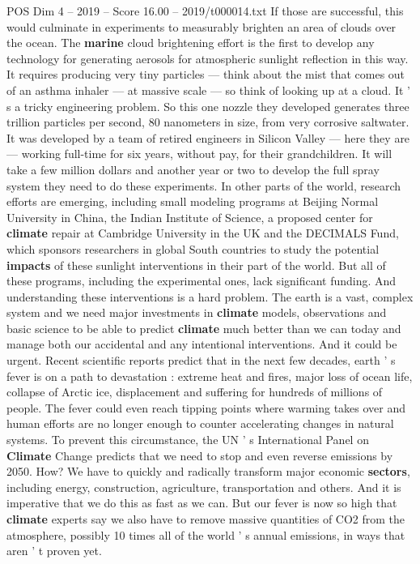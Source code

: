 \begin{textsample}{POS Dim 4 – 2019 – Score 16.00 – 2019/t000014.txt}
If those are successful, this would culminate in experiments to measurably brighten an area of clouds over the ocean.
The \textbf{marine} cloud brightening effort is the first to develop any technology for generating aerosols for atmospheric sunlight reflection in this way.
It requires producing very tiny particles — think about the mist that comes out of an asthma inhaler — at massive scale — so think of looking up at a cloud.
It ' s a tricky engineering problem.
So this one nozzle they developed generates three trillion particles per second, 80 nanometers in size, from very corrosive saltwater.
It was developed by a team of retired engineers in Silicon Valley — here they are — working full-time for six years, without pay, for their grandchildren.
It will take a few million dollars and another year or two to develop the full spray system they need to do these experiments.
In other parts of the world, research efforts are emerging, including small modeling programs at Beijing Normal University in China, the Indian Institute of Science, a proposed center for \textbf{climate} repair at Cambridge University in the UK and the DECIMALS Fund, which sponsors researchers in global South countries to study the potential \textbf{impacts} of these sunlight interventions in their part of the world.
But all of these programs, including the experimental ones, lack significant funding.
And understanding these interventions is a hard problem.
The earth is a vast, complex system and we need major investments in \textbf{climate} models, observations and basic science to be able to predict \textbf{climate} much better than we can today and manage both our accidental and any intentional interventions.
And it could be urgent.
Recent scientific reports predict that in the next few decades, earth ' s fever is on a path to devastation : extreme heat and fires, major loss of ocean life, collapse of Arctic ice, displacement and suffering for hundreds of millions of people.
The fever could even reach tipping points where warming takes over and human efforts are no longer enough to counter accelerating changes in natural systems.
To prevent this circumstance, the UN ' s International Panel on \textbf{Climate} Change predicts that we need to stop and even reverse emissions by 2050.
How?
We have to quickly and radically transform major economic \textbf{sectors}, including energy, construction, agriculture, transportation and others.
And it is imperative that we do this as fast as we can.
But our fever is now so high that \textbf{climate} experts say we also have to remove massive quantities of CO2 from the atmosphere, possibly 10 times all of the world ' s annual emissions, in ways that aren ' t proven yet.

\end{textsample}
